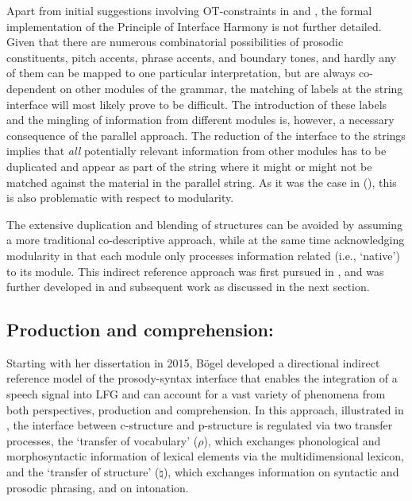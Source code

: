 \documentclass[output=paper,hidelinks]{langscibook}
\begin{document}
Apart from initial suggestions involving OT-constraints in \citet{lowe:16a} and \citet{LoweBelyaev2015}, the formal implementation of the Principle of Interface Harmony is not further detailed. Given that there are numerous combinatorial possibilities of prosodic constituents, pitch accents, phrase accents, and boundary tones, and hardly any of them can be mapped to one particular interpretation, but are always co-dependent on other modules of the grammar, the matching of labels at the string interface will most likely prove to be difficult.
The introduction of these labels and the mingling of information from different modules is, however, a necessary consequence of the parallel approach. The reduction of the interface to the strings implies that {\em all} potentially relevant information from other modules has to be duplicated and appear as part of the string where it might or might not be matched against the material in the parallel string. As it was the case in \citet{boegeletal09,boegel-etal2010} (), this is also problematic with respect to modularity.

The extensive duplication and blending of structures can be avoided by assuming a more traditional co-descriptive approach, while at the same time acknowledging modularity in that each module only processes information related (i.e., `native') to its module. This indirect reference approach was first pursued in \citet{buttking98}, and was further developed in \citet{Boegel2015} and subsequent work as discussed in the next section.



\subsection{Production and comprehension: \citet{Boegel2015}}
\label{subsec:Boegel}
Starting with her dissertation in 2015, Bögel developed a directional indirect reference model of the prosody-syntax interface that enables the integration of a speech signal into LFG and can account for a vast variety of phenomena from both perspectives, production and comprehension. In this approach, illustrated in , the interface between c-structure and p-structure is regulated via two transfer processes, the `transfer of vocabulary' ($\rho$), which exchanges phonological and morphosyntactic information of lexical elements via the multidimensional lexicon, and the `transfer of structure' ($\natural$), which exchanges information on syntactic and prosodic phrasing, and on intonation.
\end{document}
